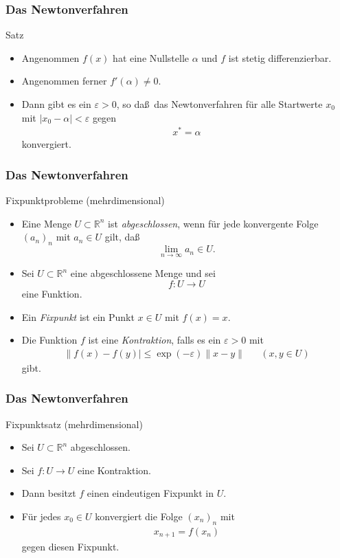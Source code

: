 \documentclass{beamer}
\renewcommand{\emph}[1]{{\textcolor{solarizedRed}{\itshape #1}}}
\newcommand\RR{\mathbb R}
\newcommand{\eps}{\varepsilon}
\newcommand{\ue}{\"u}
\newcommand{\mytitle}{Das Newtonverfahren}
\begin{document}
\begin{frame}\frametitle{\mytitle}
	\begin{block}{Satz}
		\begin{itemize}
			\item Angenommen $f(x)$ hat eine Nullstelle $\alpha$ und $f$ ist stetig differenzierbar.
			\item Angenommen ferner $f'(\alpha)\neq0$.
			\item Dann gibt es ein $\eps>0$, so da\ss\ das Newtonverfahren f\ue r alle Startwerte $x_0$ mit $|x_0-\alpha|<\eps$ gegen
				\begin{align*}
				x^*=\alpha
				\end{align*}
				konvergiert.
		\end{itemize}
	\end{block}
\end{frame}

\begin{frame}\frametitle{\mytitle}
	\begin{block}{Fixpunktprobleme (mehrdimensional)}
		\begin{itemize}
			\item Eine Menge $U\subset\RR^n$ ist \emph{abgeschlossen}, wenn f\ue r jede konvergente Folge $(a_n)_n$ mit $a_n\in U$ gilt, da\ss\ $$\lim_{n\to\infty}a_n\in U.$$
			\item Sei $U\subset\RR^n$ eine abgeschlossene Menge und sei
				$$f:U\to U$$
				eine Funktion.
			\item Ein \emph{Fixpunkt} ist ein Punkt $x\in U$ mit $f(x)=x$.
			\item Die Funktion $f$ ist eine \emph{Kontraktion}, falls es ein $\eps>0$ mit
				\begin{align*}
					\|f(x)-f(y)|\leq\exp(-\eps)\|x-y\|&&(x,y\in U)
				\end{align*}
				gibt.
		\end{itemize}
	\end{block}
\end{frame}

\begin{frame}\frametitle{\mytitle}
	\begin{block}{Fixpunktsatz (mehrdimensional)}
		\begin{itemize}
			\item Sei $U\subset\RR^n$ abgeschlossen.
			\item Sei $f:U\to U$ eine Kontraktion.
			\item Dann besitzt $f$ einen eindeutigen Fixpunkt in $U$.
			\item F\ue r jedes $x_0\in U$ konvergiert die Folge $(x_n)_n$ mit
				\begin{align*}
					x_{n+1}=f(x_n)
				\end{align*}
				gegen diesen Fixpunkt.
		\end{itemize}
	\end{block}
\end{frame}
\end{document}
